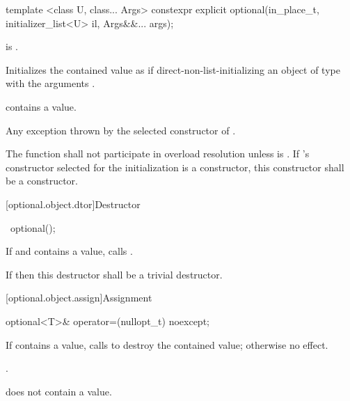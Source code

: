 %
\begin{itemdecl}
template <class U, class... Args>
  constexpr explicit optional(in_place_t, initializer_list<U> il, Args&&... args);
\end{itemdecl}

\begin{itemdescr}

\pnum
\requires
{} is .

\pnum
\effects
Initializes the contained value as if direct-non-list-initializing an object of type  with the arguments .

\pnum
\postcondition
{} contains a value.

\pnum
\throws
Any exception thrown by the selected constructor of .

\pnum
\remarks
The function shall not participate in overload resolution unless  is .
If 's constructor selected for the initialization is a  constructor, this constructor shall be a  constructor.
\end{itemdescr}

[optional.object.dtor]{Destructor}

%
\begin{itemdecl}
~optional();
\end{itemdecl}

\begin{itemdescr}
\pnum
\effects
If  and  contains a value, calls .

\pnum
\remarks
If  then this destructor shall be a trivial destructor.
\end{itemdescr}

[optional.object.assign]{Assignment}

%
\begin{itemdecl}
optional<T>& operator=(nullopt_t) noexcept;
\end{itemdecl}

\begin{itemdescr}
\pnum
\effects
If  contains a value, calls  to destroy the contained value; otherwise no effect.

\pnum
\returns
{}.

\pnum
\postcondition
{} does not contain a value.
\end{itemdescr}

